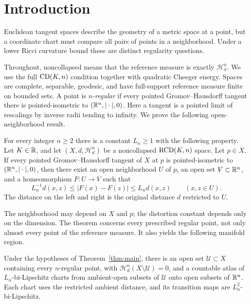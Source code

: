 \section{Introduction}

Euclidean tangent spaces describe the geometry of a metric space at a
point, but a coordinate chart must compare all pairs of points in a
neighborhood. Under a lower Ricci curvature bound these are distinct
regularity questions.

Throughout, noncollapsed means that the reference measure is exactly
\(\mathcal H_d^n\). We use the full \(\mathrm{CD}(K,n)\) condition together with
quadratic Cheeger energy. Spaces are complete, separable, geodesic, and
have full-support reference measure finite on bounded sets. A point is
\emph{\(n\)-regular} if every pointed Gromov--Hausdorff tangent there is
pointed-isometric to \((\mathbb R^n,|\cdot|,0)\). Here a tangent is a pointed
limit of rescalings by inverse radii tending to infinity.
We prove the following open-neighborhood result.

\begin{theorem}\label{thm:main}
For every integer \(n\ge2\) there is a constant \(L_n\ge1\) with
the following property. Let \(K\in\mathbb R\), and let
\((X,d,\mathcal H_d^n)\) be a noncollapsed \(\mathrm{RCD}(K,n)\) space.
Let \(p\in X\).
If every pointed Gromov--Hausdorff tangent of \(X\) at \(p\) is
pointed-isometric to \((\mathbb R^n,|\cdot|,0)\), then there exist an open
neighborhood \(U\) of \(p\), an open set \(V\subset\mathbb R^n\), and a
homeomorphism \(F:U\to V\) such that
\[
 L_n^{-1}d(x,z)\le |F(x)-F(z)|\le L_nd(x,z)
 \qquad (x,z\in U).
\]
The distance on the left and right is the original distance \(d\)
restricted to \(U\).
\end{theorem}

The neighborhood may depend on \(X\) and \(p\); the distortion
constant depends only on the dimension. The theorem concerns every
prescribed regular point, not only almost every point of the reference
measure. It also yields the following manifold region.

\begin{corollary}\label{cor:full-measure-atlas}
Under the hypotheses of Theorem~\ref{thm:main}, there is an open set
\(\mathcal U\subset X\) containing every \(n\)-regular point, with
\(\mathcal H_d^n(X\setminus\mathcal U)=0\), and a countable atlas
of \(L_n\)-bi-Lipschitz charts from ambient-open subsets of
\(\mathcal U\) onto open subsets of \(\mathbb R^n\). Each chart uses the
restricted ambient distance, and its transition maps are
\(L_n^2\)-bi-Lipschitz.
\end{corollary}

